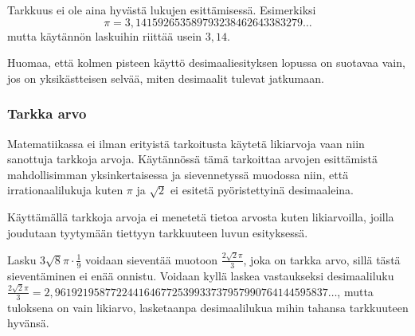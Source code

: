 Tarkkuus ei ole aina hyvästä lukujen esittämisessä. Esimerkiksi
\[ \pi = 3,141592653589793238462643383279 \ldots \]
mutta käytännön laskuihin riittää usein $3,14$.

Huomaa, että kolmen pisteen käyttö desimaaliesityksen lopussa on suotavaa vain, jos on yksikästteisen selvää, miten desimaalit tulevat jatkumaan.

\subsubsection*{Tarkka arvo}

Matematiikassa ei ilman erityistä tarkoitusta käytetä likiarvoja vaan niin sanottuja tarkkoja arvoja. Käytännössä tämä tarkoittaa arvojen esittämistä mahdollisimman yksinkertaisessa ja sievennetyssä muodossa niin, että irrationaalilukuja kuten $\pi$ ja $\sqrt{2}$ ei esitetä pyöristettyinä desimaaleina. %

Käyttämällä tarkkoja arvoja ei menetetä tietoa arvosta kuten likiarvoilla, joilla joudutaan tyytymään tiettyyn tarkkuuteen luvun esityksessä.

\begin{esimerkki}
Lasku $3\sqrt{8}\pi \cdot \frac{1}{9}$ voidaan sieventää muotoon $\frac{2\sqrt{2}\pi}{3}$, joka on tarkka arvo, sillä tästä sieventäminen ei enää onnistu. Voidaan kyllä laskea vastaukseksi desimaaliluku $\frac{2\sqrt{2}\pi}{3}=2,9619219587722441646772539933737957990764144595837\ldots$, mutta tuloksena on vain likiarvo, lasketaanpa desimaalilukua mihin tahansa tarkkuuteen hyvänsä. %
\end{esimerkki}

